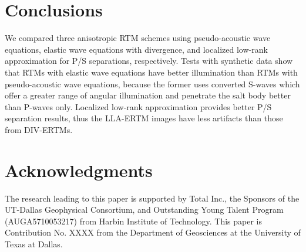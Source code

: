 \documentclass[manuscript,ulem,graphix,revised]{geophysics}
\begin{document}
\section{Conclusions}
\indent\indent
We compared three anisotropic RTM schemes using pseudo-acoustic wave equations, elastic wave equations with divergence, and localized low-rank approximation for P/S separations, respectively. Tests with synthetic data show that RTMs with elastic wave equations have better illumination than RTMs with pseudo-acoustic wave equations, because the former uses converted S-waves which offer a greater range of angular illumination and penetrate the salt body better than P-waves only. Localized low-rank approximation provides better P/S separation results, thus the LLA-ERTM images have less artifacts than those from DIV-ERTMs. 

\section{Acknowledgments}
\indent\indent
The research leading to this paper is supported by Total Inc., the Sponsors of the UT-Dallas Geophysical Consortium, and Outstanding Young Talent Program (AUGA5710053217) from Harbin Institute of Technology. This paper is Contribution No. XXXX from the Department of Geosciences at the University of Texas at Dallas.




%


%

\newpage


\end{document}
